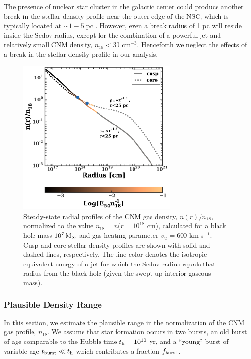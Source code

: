 \documentclass[usenatbib,fleqn]{mnras}
\newcommand{\Msun}{{\rm M_\odot}}
\begin{document}
The presence of nuclear star
cluster in the galactic center could produce another break in the
stellar density profile near the outer edge of the NSC, which is
typically located at $\sim 1-5$ pc \citep{Georgiev+2014}.  However,
even a break radius of 1 pc will reside inside the Sedov radius,
except for the combination of a powerful jet and relatively small CNM
density, $n_{18}<30$ cm$^{-3}$.  Henceforth we neglect the effects of
a break in the stellar density profile in our analysis.


\begin{figure}
\includegraphics[width=8cm]{sedov_radius.pdf}
\caption{\label{fig:profiles} Steady-state radial profiles of the CNM
  gas density, $n(r)/n_{18}$, normalized to the value $n_{18} = n(r =
  10^{18}$ cm), calculated for a black hole mass $10^{7} \,\Msun$ and
  gas heating parameter $v_w=600$ km s$^{-1}$.  Cusp and core stellar
  density profiles are shown with solid and dashed lines,
  respectively.  The line color denotes the isotropic equivalent
  energy of a jet for which the Sedov radius equals that radius from
  the black hole (given the swept up interior gaseous mass).}
\end{figure}



\subsubsection{Plausible Density Range}
\label{sec:densAllowed}

In this section, we estimate the plausible range in the normalization
of the CNM gas profile, $n_{18}$.  We assume that star formation
occurs in two bursts, an old burst of age comparable to the Hubble
time $t_{\rm h} = 10^{10}$ yr, and a ``young'' burst of variable age
$t_{\rm burst} \ll t_{\rm h}$ which contributes a fraction $f_{\rm
  burst}$.
\end{document}
